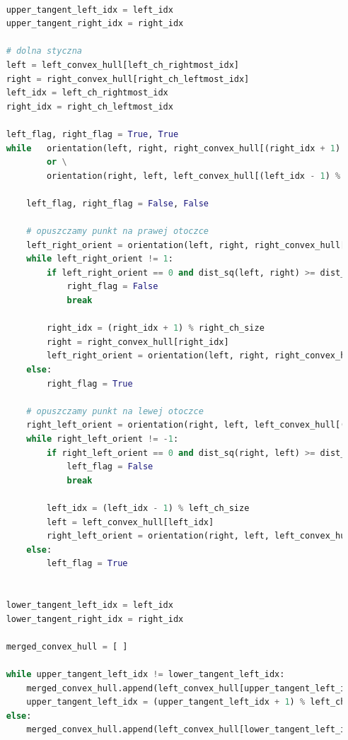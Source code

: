 \documentclass[11pt]{article}
\theoremstyle{remark} \newtheorem{definition}{def.}
\theoremstyle{definition} \newtheorem{twierdzenie}{tw.}
\begin{document}
\begin{lstlisting}[language=Python]
            
    upper_tangent_left_idx = left_idx
    upper_tangent_right_idx = right_idx
    
    # dolna styczna
    left = left_convex_hull[left_ch_rightmost_idx]
    right = right_convex_hull[right_ch_leftmost_idx]
    left_idx = left_ch_rightmost_idx
    right_idx = right_ch_leftmost_idx
            
    left_flag, right_flag = True, True
    while   orientation(left, right, right_convex_hull[(right_idx + 1) % right_ch_size]) != 1 and right_flag \
            or \
            orientation(right, left, left_convex_hull[(left_idx - 1) % left_ch_size]) != -1 and left_flag:
                
        left_flag, right_flag = False, False
        
        # opuszczamy punkt na prawej otoczce
        left_right_orient = orientation(left, right, right_convex_hull[(right_idx + 1) % right_ch_size])
        while left_right_orient != 1:
            if left_right_orient == 0 and dist_sq(left, right) >= dist_sq(left, right_convex_hull[(right_idx + 1) % right_ch_size]):
                right_flag = False
                break
            
            right_idx = (right_idx + 1) % right_ch_size
            right = right_convex_hull[right_idx]
            left_right_orient = orientation(left, right, right_convex_hull[(right_idx + 1) % right_ch_size])
        else:
            right_flag = True
            
        # opuszczamy punkt na lewej otoczce
        right_left_orient = orientation(right, left, left_convex_hull[(left_idx - 1) % left_ch_size])
        while right_left_orient != -1:
            if right_left_orient == 0 and dist_sq(right, left) >= dist_sq(right, left_convex_hull[(left_idx - 1) % left_ch_size]):
                left_flag = False
                break
                    
            left_idx = (left_idx - 1) % left_ch_size
            left = left_convex_hull[left_idx]
            right_left_orient = orientation(right, left, left_convex_hull[(left_idx - 1) % left_ch_size])
        else:
            left_flag = True
            
            
    lower_tangent_left_idx = left_idx
    lower_tangent_right_idx = right_idx
    
    merged_convex_hull = [ ]

    while upper_tangent_left_idx != lower_tangent_left_idx:
        merged_convex_hull.append(left_convex_hull[upper_tangent_left_idx])
        upper_tangent_left_idx = (upper_tangent_left_idx + 1) % left_ch_size
    else:
        merged_convex_hull.append(left_convex_hull[lower_tangent_left_idx])
        

\end{lstlisting}
\end{document}
